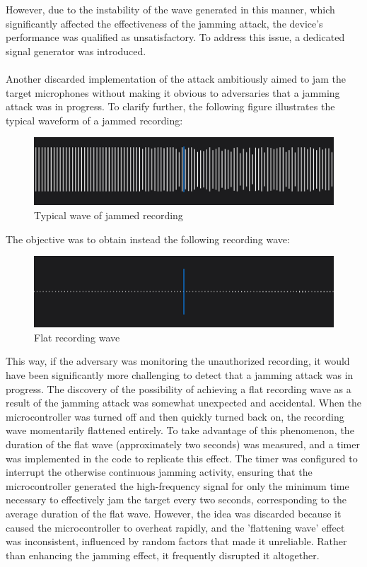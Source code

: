 However, due to the instability of the wave generated in this manner, which significantly affected the effectiveness of the jamming attack, the device's performance was qualified as unsatisfactory. 
To address this issue, a dedicated signal generator was introduced.
\\\\
Another discarded implementation of the attack ambitiously aimed to jam the target microphones without making it obvious to adversaries that a jamming attack was in progress.
To clarify further, the following figure illustrates the typical waveform of a jammed recording:
\begin{figure}[H]
    \centering
    \includegraphics[width=\linewidth]{images/jammed_wave1.jpg}
    \caption{Typical wave of jammed recording}
\end{figure}
The objective was to obtain instead the following recording wave:
\begin{figure}[H]
    \centering
    \includegraphics[width=\linewidth]{images/jammed_wave2.jpg}
    \caption{Flat recording wave}
\end{figure}
This way, if the adversary was monitoring the unauthorized recording, it would have been significantly more challenging to detect that a jamming attack was in progress.
The discovery of the possibility of achieving a flat recording wave as a result of the jamming attack was somewhat unexpected and accidental. 
When the microcontroller was turned off and then quickly turned back on, the recording wave momentarily flattened entirely.
To take advantage of this phenomenon, the duration of the flat wave (approximately two seconds) was measured, and a timer was implemented in the code to replicate this effect.
The timer was configured to interrupt the otherwise continuous jamming activity, ensuring that the microcontroller generated the high-frequency signal for only the minimum time necessary to effectively jam the target every two seconds, corresponding to the average duration of the flat wave.
However, the idea was discarded because it caused the microcontroller to overheat rapidly, and the 'flattening wave' effect was inconsistent, influenced by random factors that made it unreliable. 
Rather than enhancing the jamming effect, it frequently disrupted it altogether.